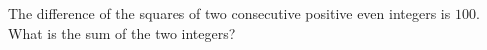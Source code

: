 The difference of the squares of two consecutive positive even integers is $100$. What is the sum of the two integers?
